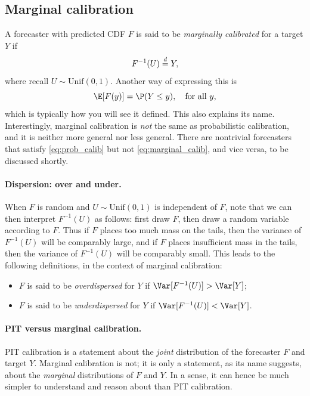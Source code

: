 \documentclass{article}
\begin{document}
\subsection{Marginal calibration}

A forecaster with predicted CDF $F$ is said to be \emph{marginally calibrated}
for a target $Y$ if  
\begin{equation}
\label{eq:marginal_calib}
F^{-1}(U) \overset{d}{=} Y,
\end{equation}
where recall $U \sim \mathrm{Unif}(0,1)$. Another way of expressing this is  
\[
\E[F(y)] = \P(Y \leq y), \quad \text{for all $y$},
\]
which is typically how you will see it defined. This also explains its name. 
Interestingly, marginal calibration is \emph{not} the same as probabilistic
calibration, and it is neither more general nor less general. There are
nontrivial forecasters that satisfy \eqref{eq:prob_calib} but not
\eqref{eq:marginal_calib}, and vice versa, to be discussed shortly.  

\paragraph{Dispersion: over and under.}

When $F$ is random and $U \sim \mathrm{Unif}(0,1)$ is independent of $F$, note
that we can then interpret $F^{-1}(U)$ as follows: first draw $F$, then draw a
random variable according to $F$. Thus if $F$ places too much mass on the tails,
then the variance of $F^{-1}(U)$ will be comparably large, and if $F$ places 
insufficient mass in the tails, then the variance of $F^{-1}(U)$ will be
comparably small. This leads to the following definitions, in the context of
marginal calibration:     

\begin{itemize}
\item $F$ is said to be \emph{overdispersed} for $Y$ if $\Var[F^{-1}(U)] > \Var[Y]$;
\item $F$ is said to be \emph{underdispersed} for $Y$ if $\Var[F^{-1}(U)] < \Var[Y]$.
\end{itemize}

\paragraph{PIT versus marginal calibration.}

PIT calibration is a statement about the \emph{joint} distribution of the
forecaster $F$ and target $Y$. Marginal calibration is not; it is only a
statement, as its name suggests, about the \emph{marginal} distributions of $F$
and $Y$. In a sense, it can hence be much simpler to understand and reason about 
than PIT calibration.
\end{document}
